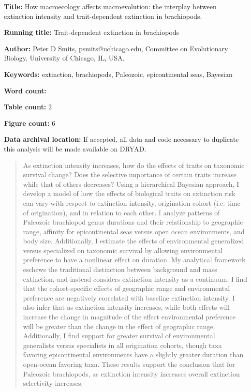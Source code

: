 \documentclass{article}
\begin{document}
\linenumbers
\modulolinenumbers[2]


\begin{titlepage}
  \begin{large}
    \textbf{Title:} How macroecology affects macroevolution: the interplay between extinction intensity and trait-dependent extinction in brachiopods.
  \end{large}

  \textbf{Running title:} Trait-dependent extinction in brachiopods

  \textbf{Author:} Peter D Smits, psmits@uchicago.edu, Committee on Evolutionary Biology, University of Chicago, IL, USA.

  \textbf{Keywords:} extinction, brachiopods, Paleozoic, epicontinental seas, Bayesian

  \textbf{Word count:} 
  
  \textbf{Table count:} 2
 
  \textbf{Figure count:} 6

  \textbf{Data archival location:} If accepted, all data and code necessary to duplicate this analysis will be made available on DRYAD.

\end{titlepage}

\begin{abstract}
  As extinction intensity increases, how do the effects of traits on taxonomic survival change? Does the selective importance of certain traits increase while that of others decreases? Using a hierarchical Bayesian approach, I develop a model of how the effects of biological traits on extinction risk can vary with respect to extinction intensity, origination cohort (i.e. time of origination), and in relation to each other. I analyze patterns of Paleozoic brachiopod genus durations and their relationship to geographic range, affinity for epicontinental seas versus open ocean environments, and body size. Additionally, I estimate the effects of environmental generalized versus specialized on taxonomic survival by allowing environmental preference to have a nonlinear effect on duration. My analytical framework eschews the traditional distinction between background and mass extinction, and instead considers extinction intensity as a continuum. I find that the cohort-specific effects of geographic range and environmental preference are negatively correlated with baseline extinction intensity. I also infer that as extinction intensity increases, while both effects will increase the change in magnitude of the effect environmental preference will be greater than the change in the effect of geographic range. Additionally, I find support for greater survival of environmental generalists versus specialists in all origination cohorts, though taxa favoring epicontinental environments have a slightly greater duration than open-ocean favoring taxa. These results support the conclusion that for Paleozoic brachiopods, as extinction intensity increases overall extinction selectivity increases.
\end{abstract}
\end{document}
